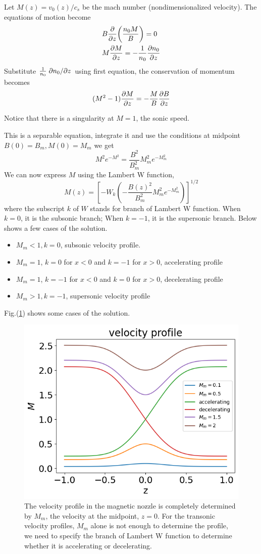 Let $M(z) = v_0(z)/c_s$ be the mach number (nondimensionalized velocity). The equations of motion become
\begin{align*}
	&B\pdv{z}(\frac{n_0M}{B}) = 0\\
	&M\pdv{M}{z} = -\frac{1}{n_0}\pdv{n_0}{z}
\end{align*}
Substitute $\frac{1}{n_0}\pdv*{n_0}{z}$ using first equation, the conservation of momentum becomes
\[ (M^2-1)\pdv{M}{z} = -\frac{M}{B}\pdv{B}{z} \]

Notice that there is a singularity at $M=1$, the sonic speed.

This is a separable equation, integrate it and use the conditions at midpoint $B(0)=B_m, M(0)=M_m$ we get
\[ M^2e^{-M^2} = \frac{B^2}{B_m^2}M_m^2e^{-M_m^2} \]
We can now express $M$ using the Lambert W function,
\[ M(z) = \left[ -W_k\left(-\frac{B(z)^2}{B_m^2}M_m^2e^{-M_m^2}\right) \right]^{1/2} \]
where the subscript $k$ of $W$ stands for branch of Lambert W function. When $k=0$, it is the subsonic branch; When $k=-1$, it is the supersonic branch. Below shows a few cases of the solution.
\begin{itemize}
	\item $M_m < 1, k=0$, subsonic velocity profile.
	\item $M_m = 1$, $k=0$ for $x<0$ and $k=-1$ for $x>0$, accelerating profile
	\item $M_m = 1$, $k=-1$ for $x<0$ and $k=0$ for $x>0$, decelerating profile
	\item $M_m > 1, k=-1$, supersonic velocity profile
\end{itemize}
 Fig.(\ref{fig:velocity-profiles}) shows some cases of the solution.
\begin{figure}[H]
	\centering
	\includegraphics[width=0.7\linewidth]{img/governing-equations/velocity-profiles}
	\caption{The velocity profile in the magnetic nozzle is completely determined by $M_m$, the velocity at the midpoint, $z=0$. For the transonic velocity profiles, $M_m$ alone is not enough to determine the profile, we need to specify the branch of Lambert W function to determine whether it is accelerating or decelerating.}
	\label{fig:velocity-profiles}
\end{figure}

